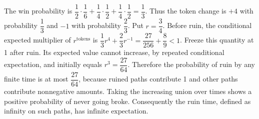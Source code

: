 The win probability is $\dfrac{1}{2}\cdot\dfrac{1}{6}+\dfrac{1}{4}\cdot\dfrac{1}{2}+\dfrac{1}{4}\cdot\dfrac{1}{2}=\dfrac{1}{3}$. Thus the token change is $+4$ with probability $\dfrac{1}{3}$ and $-1$ with probability $\dfrac{2}{3}$. Put $r=\dfrac{3}{4}$. Before ruin, the conditional expected multiplier of $r^{\text{tokens}}$ is $\dfrac{1}{3}r^4+\dfrac{2}{3}r^{-1}=\dfrac{27}{256}+\dfrac{8}{9}<1$. Freeze this quantity at 1 after ruin. Its expected value cannot increase, by repeated conditional expectation, and initially equals $r^3=\dfrac{27}{64}$. Therefore the probability of ruin by any finite time is at most $\dfrac{27}{64}$, because ruined paths contribute 1 and other paths contribute nonnegative amounts. Taking the increasing union over times shows a positive probability of never going broke. Consequently the ruin time, defined as infinity on such paths, has $\boxed{\text{infinite expectation}}$.
